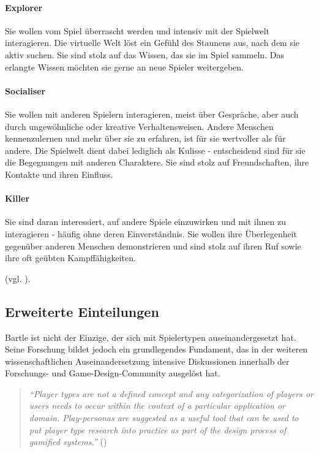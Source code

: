 \paragraph{Explorer}
Sie wollen vom Spiel überrascht werden und intensiv mit der Spielwelt interagieren. Die virtuelle Welt löst ein Gefühl des Staunens aus, nach dem sie aktiv suchen. Sie sind stolz auf das Wissen, das sie im Spiel sammeln. Das erlangte Wissen möchten sie gerne an neue Spieler weitergeben.

\paragraph{Socialiser}
Sie wollen mit anderen Spielern interagieren, meist über Gespräche, aber auch durch ungewöhnliche oder kreative Verhaltensweisen. Andere Menschen kennenzulernen und mehr über sie zu erfahren, ist für sie wertvoller als für andere. Die Spielwelt dient dabei lediglich als Kulisse - entscheidend sind für sie die Begegnungen mit anderen Charaktere. Sie sind stolz auf Freundschaften, ihre Kontakte und ihren Einfluss.

\paragraph{Killer}
Sie sind daran interessiert, auf andere Spiele einzuwirken und mit ihnen zu interagieren - häufig ohne deren Einverständnis. Sie wollen ihre Überlegenheit gegenüber anderen Menschen demonstrieren und sind stolz auf ihren Ruf sowie ihre oft geübten Kampffähigkeiten.

(vgl. \cite{bartle_hearts_1996}).

\subsection{Erweiterte Einteilungen}
Bartle ist nicht der Einzige, der sich mit Spielertypen auseinandergesetzt hat. Seine Forschung bildet jedoch ein grundlegendes Fundament, das in der weiteren wissenschaftlichen Auseinandersetzung intensive Diskussionen innerhalb der Forschungs- und Game-Design-Community ausgelöst hat. 
\begin{quote}
    \textit{
        \enquote{Player types are not a defined concept and any categorization of players or users needs to occur within the context of a particular application or domain. Play-personas are suggested as a useful tool that can be used to put player type research into practice as part of the design process of gamified systems.}
    } 
    (\cite{dixon_player_nodate})
\end{quote}

